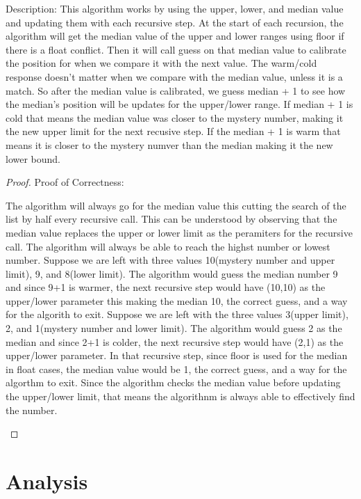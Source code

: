 \documentclass[11pt]{article}
\begin{document}
\begin{text} 
Description:
This algorithm works by using the upper, lower, and median value and updating them with each recursive step. At the start of each recursion, the algorithm will get the median value of the upper and lower ranges using floor if there is a float conflict. Then it will call guess on that median value to calibrate the position for when we compare it with the next value. The warm/cold response doesn't matter when we compare with the median value, unless it is a match. So after the median value is calibrated, we guess median + 1 to see how the median's position will be updates for the upper/lower range. If median + 1 is cold that means the median value was closer to the mystery number, making it the new upper limit for the next recusive step. If the median + 1 is warm that means it is closer to the mystery numver than the median making it the new lower bound.
\end{text}
\begin{proof}
Proof of Correctness: \\
\begin{text}
The algorithm will always go for the median value this cutting the search of the list by half every recursive call. This can be understood by observing that the median value replaces the upper or lower limit as the peramiters for the recursive call.
The algorithm will always be able to reach the highst number or lowest number. Suppose we are left with three values  10(mystery number and upper limit), 9, and 8(lower limit). The algorithm would guess the median number 9 and since 9+1 is warmer, the next recursive step would have (10,10) as the upper/lower parameter this making the median 10, the correct guess, and a way for the algorith to exit. Suppose we are left with the three values 3(upper limit), 2, and 1(mystery number and lower limit). The algorithm would guess 2 as the median and since 2+1 is colder, the next recursive step would have (2,1) as the upper/lower parameter. In that recursive step, since floor is used for the median in float cases, the median value would be 1, the correct guess, and a way for the algorthm to exit.
Since the algorithm checks the median value before updating the upper/lower limit, that means the algorithnm is always able to effectively find the number.
\end{text}
\end{proof}

\section*{Analysis}
\end{document}
